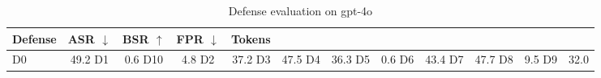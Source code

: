 \begin{table}[t]
\centering
\small
\begin{tabular}{l c c c r}
\toprule
Defense & ASR $\downarrow$ & BSR $\uparrow$ & FPR $\downarrow$ & Tokens \\
\midrule
D0 & 49.2%
D1 & 0.6%
D10 & 4.8%
D2 & 37.2%
D3 & 47.5%
D4 & 36.3%
D5 & 0.6%
D6 & 43.4%
D7 & 47.7%
D8 & 9.5%
D9 & 32.0%
\bottomrule
\end{tabular}
\caption{Defense evaluation on gpt-4o}
\label{tab:results_gpt_4o}
\end{table}